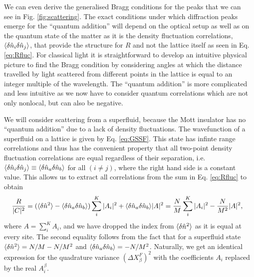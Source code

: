 We can even derive the generalised Bragg conditions for the peaks that
we can see in Fig. \ref{fig:scattering}. The exact conditions under
which diffraction peaks emerge for the ``quantum addition'' will
depend on the optical setup as well as on the quantum state of the
matter as it is the density fluctuation correlations,
$\langle \delta \hat{n}_i \delta \hat{n}_j \rangle$, that provide the structure for $R$ and
not the lattice itself as seen in Eq. \eqref{eq:Rfluc}. For classical
light it is straightforward to develop an intuitive physical picture
to find the Bragg condition by considering angles at which the
distance travelled by light scattered from different points in the
lattice is equal to an integer multiple of the wavelength. The
``quantum addition'' is more complicated and less intuitive as we now
have to consider quantum correlations which are not only nonlocal, but
can also be negative.

We will consider scattering from a superfluid, because the Mott
insulator has no ``quantum addition'' due to a lack of density
fluctuations. The wavefunction of a superfluid on a lattice is given
by Eq. \eqref{eq:GSSF}. This state has infinte range correlations and
thus has the convenient property that all two-point density
fluctuation correlations are equal regardless of their separation,
i.e.~$\langle \delta \hat{n}_i \delta \hat{n}_j \rangle \equiv \langle \delta \hat{n}_a \delta \hat{n}_b \rangle$
for all $(i \ne j)$, where the right hand side is a constant
value. This allows us to extract all correlations from the sum in
Eq. \eqref{eq:Rfluc} to obtain
\begin{equation}
  \label{eq:RSF}
  \frac{R}{|C|^2} = (\langle \delta \hat{n}^2 \rangle - \langle \delta \hat{n}_a \delta \hat{n}_b \rangle) \sum_i^K
  |A_i|^2 + \langle \delta \hat{n}_a \delta \hat{n}_b \rangle |A|^2 = \frac{N}{M} \sum_i^K
  |A_i|^2 - \frac{N}{M^2} |A|^2,
\end{equation}
where $A = \sum_i^K A_i$, and we have dropped the index from
$\langle \delta \hat{n}^2 \rangle$ as it is equal at every site. The second
equality follows from the fact that for a superfluid state
$\langle \delta \hat{n}^2 \rangle = N/M - N/M^2$ and
$\langle \delta \hat{n}_a \delta \hat{n}_b \rangle = -N/M^2$. Naturally, we get an identical
expression for the quadrature variance $(\Delta X^F_\beta)^2$ with the
coefficients $A_i$ replaced by the real $A_i^\beta$.

